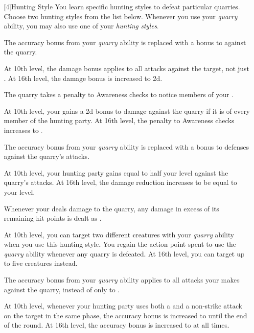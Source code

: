         [4]{Hunting Style}
        You learn specific hunting styles to defeat particular quarries.
        Choose two hunting styles from the list below.
        Whenever you use your \textit{quarry} ability, you may also use one of your \textit{hunting styles}.
        {
            The accuracy bonus from your \textit{quarry} ability is replaced with a  bonus to  against the quarry.

            At 10th level, the damage bonus applies to all attacks against the target, not just .
            At 16th level, the damage bonus is increased to \plus2d.

            The quarry takes a  penalty to Awareness checks to notice members of your .

            At 10th level, your  gains a \plus2d bonus to damage against the quarry if it is \unaware of every member of the hunting party.
            At 16th level, the penalty to Awareness checks increases to .

            The accuracy bonus from your \textit{quarry} ability is replaced with a  bonus to defenses against the quarry's attacks.

            At 10th level, your hunting party gains  equal to half your level against the quarry's attacks.
            At 16th level, the damage reduction increases to be equal to your level.

            Whenever your  deals damage to the quarry, any damage in excess of its remaining hit points is dealt as .

            At 10th level, you can target two different creatures with your \textit{quarry} ability when you use this hunting style.
            You regain the action point spent to use the \textit{quarry} ability whenever any quarry is defeated. 
            At 16th level, you can target up to five creatures instead.

            The accuracy bonus from your \textit{quarry} ability applies to all attacks your  makes against the quarry, instead of only to .

            At 10th level, whenever your hunting party uses both a  and a non-strike attack on the target in the same phase, the accuracy bonus is increased to  until the end of the round.
            At 16th level, the accuracy bonus is increased to  at all times.

}

